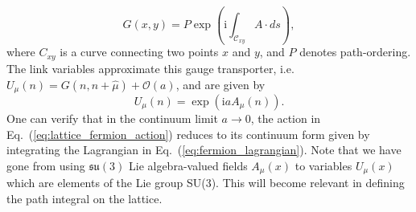 \begin{equation}
    G(x, y)=P \exp \left(\mathrm{i} \int_{\mathcal{C}_{x y}} A \cdot d s\right),
\end{equation}
where $C_{xy}$ is a curve connecting two points $x$ and $y$, and $P$ denotes path-ordering. The link variables approximate this gauge transporter, i.e. $U_\mu(n) = G(n, n+\hat \mu) + \mathcal O(a)$, and are given by
\begin{equation}
    U_{\mu}(n)=\exp \left(\mathrm{i} a A_{\mu}(n)\right).
\end{equation}
One can verify that in the continuum limit $a\rightarrow 0$, the action in Eq.~(\ref{eq:lattice_fermion_action}) reduces to its continuum form given by integrating the Lagrangian in Eq.~(\ref{eq:fermion_lagrangian}). Note that we have gone from using $\mathfrak{su}(3)$ Lie algebra-valued fields $A_\mu(x)$ to variables $U_\mu(x)$ which are elements of the Lie group SU(3). This will become relevant in defining the path integral on the lattice.
